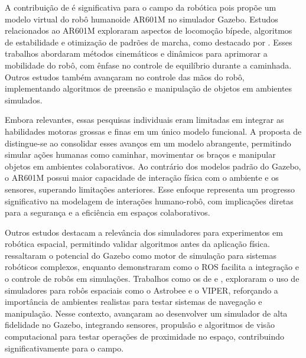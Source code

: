 A contribuição de \citep{zagirov2023modeling}  é significativa para o campo da robótica pois propõe um modelo virtual do robô humanoide AR601M no simulador Gazebo. Estudos relacionados ao AR601M exploraram aspectos de locomoção bípede, algoritmos de estabilidade e otimização de padrões de marcha, como destacado por \citep{zagirov2023modeling}. Esses trabalhos abordaram métodos cinemáticos e dinâmicos para aprimorar a mobilidade do robô, com ênfase no controle de equilíbrio durante a caminhada. Outros estudos também avançaram no controle das mãos do robô, implementando algoritmos de preensão e manipulação de objetos em ambientes simulados.

Embora relevantes, essas pesquisas individuais eram limitadas em integrar as habilidades motoras grossas e finas em um único modelo funcional. A proposta de \citep{zagirov2023modeling} distingue-se ao consolidar esses avanços em um modelo abrangente, permitindo simular ações humanas como caminhar, movimentar os braços e manipular objetos em ambientes colaborativos. Ao contrário dos modelos padrão do Gazebo, o AR601M possui maior capacidade de interação física com o ambiente e os sensores, superando limitações anteriores. Esse enfoque representa um progresso significativo na modelagem de interações humano-robô, com implicações diretas para a segurança e a eficiência em espaços colaborativos.

Outros estudos destacam a relevância dos simuladores para experimentos em robótica espacial, permitindo validar algoritmos antes da aplicação física. \citep{koenig2004design} ressaltaram o potencial do Gazebo como motor de simulação para sistemas robóticos complexos, enquanto \citep{quigley2009ros} demonstraram como o ROS facilita a integração e o controle de robôs em simulações. Trabalhos como os de \citep{smith2016astrobee} e \citep{bualat2018astrobee}, exploraram o uso de simuladores para robôs espaciais como o Astrobee e o VIPER, reforçando a importância de ambientes realistas para testar sistemas de navegação e manipulação. Nesse contexto, \citep{santana2021development} avançaram ao desenvolver um simulador de alta fidelidade no Gazebo, integrando sensores, propulsão e algoritmos de visão computacional para testar operações de proximidade no espaço, contribuindo significativamente para o campo.

